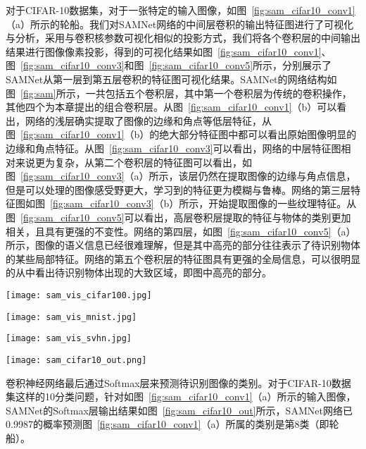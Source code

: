 对于CIFAR-10数据集，对于一张特定的输入图像，如图~\ref{fig:sam_cifar10_conv1}（a）所示的轮船。我们对SAMNet网络的中间层卷积的输出特征图进行了可视化与分析，采用与卷积核参数可视化相似的投影方式，我们将各个卷积层的中间输出结果进行图像像素投影，得到的可视化结果如图~\ref{fig:sam_cifar10_conv1}、图~\ref{fig:sam_cifar10_conv3}和图~\ref{fig:sam_cifar10_conv5}所示，分别展示了SAMNet从第一层到第五层卷积的特征图可视化结果。SAMNet的网络结构如图~\ref{fig:sam}所示，一共包括五个卷积层，其中第一个卷积层为传统的卷积操作，其他四个为本章提出的组合卷积层。从图~\ref{fig:sam_cifar10_conv1}（b）可以看出，网络的浅层确实提取了图像的边缘和角点等低层特征，从图~\ref{fig:sam_cifar10_conv1}（b）的绝大部分特征图中都可以看出原始图像明显的边缘和角点特征。从图~\ref{fig:sam_cifar10_conv3}可以看出，网络的中层特征图相对来说更为复杂，从第二个卷积层的特征图可以看出，如图~\ref{fig:sam_cifar10_conv3}（a）所示，该层仍然在提取图像的边缘与角点信息，但是可以处理的图像感受野更大，学习到的特征更为模糊与鲁棒。网络的第三层特征图如图~\ref{fig:sam_cifar10_conv3}（b）所示，开始提取图像的一些纹理特征。从图~\ref{fig:sam_cifar10_conv5}可以看出，高层卷积层提取的特征与物体的类别更加相关，且具有更强的不变性。网络的第四层，如图~\ref{fig:sam_cifar10_conv5}（a）所示，图像的语义信息已经很难理解，但是其中高亮的部分往往表示了待识别物体的某些局部特征。网络的第五个卷积层的特征图具有更强的全局信息，可以很明显的从中看出待识别物体出现的大致区域，即图中高亮的部分。

\begin{figure*}
\centering
\texttt{[image: sam\_vis\_cifar100.jpg]}
\caption{CIFAR-100卷积层特征可视化。}
\label{fig:sam_vis_cifar100}
\end{figure*}

\begin{figure*}
\centering
\texttt{[image: sam\_vis\_mnist.jpg]}
\caption{MNIST卷积层特征可视化。}
\label{fig:sam_vis_mnist}
\end{figure*}

\begin{figure*}
\centering
\texttt{[image: sam\_vis\_svhn.jpg]}
\caption{SVHN卷积层特征可视化。}
\label{fig:sam_vis_svhn}
\end{figure*}


\begin{figure*}
\centering
\texttt{[image: sam\_cifar10\_out.png]}
\caption{Softmax层各类别预测概率输出。}
\label{fig:sam_cifar10_out}
\end{figure*}

卷积神经网络最后通过Softmax层来预测待识别图像的类别。对于CIFAR-10数据集这样的10分类问题，针对如图~\ref{fig:sam_cifar10_conv1}（a）所示的输入图像，SAMNet的Softmax层输出结果如图~\ref{fig:sam_cifar10_out}所示，SAMNet网络已0.9987的概率预测图~\ref{fig:sam_cifar10_conv1}（a）所属的类别是第8类（即轮船）。

